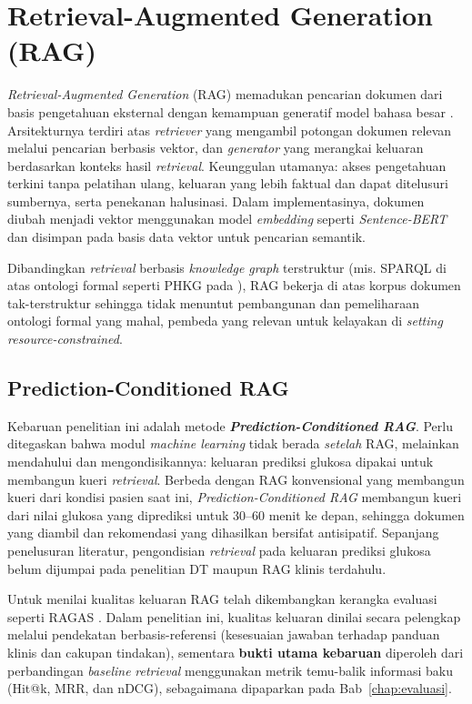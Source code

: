\section{Retrieval-Augmented Generation (RAG)}
\emph{Retrieval-Augmented Generation} (RAG) memadukan pencarian dokumen dari basis pengetahuan eksternal dengan kemampuan generatif model bahasa besar \autocite{lewis2020}. Arsitekturnya terdiri atas \emph{retriever} yang mengambil potongan dokumen relevan melalui pencarian berbasis vektor, dan \emph{generator} yang merangkai keluaran berdasarkan konteks hasil \emph{retrieval}. Keunggulan utamanya: akses pengetahuan terkini tanpa pelatihan ulang, keluaran yang lebih faktual dan dapat ditelusuri sumbernya, serta penekanan halusinasi. Dalam implementasinya, dokumen diubah menjadi vektor menggunakan model \emph{embedding} seperti \emph{Sentence-BERT} \autocite{reimers2019} dan disimpan pada basis data vektor untuk pencarian semantik.

Dibandingkan \emph{retrieval} berbasis \emph{knowledge graph} terstruktur (mis. SPARQL di atas ontologi formal seperti PHKG pada \textcite{rad2024}), RAG bekerja di atas korpus dokumen tak-terstruktur sehingga tidak menuntut pembangunan dan pemeliharaan ontologi formal yang mahal, pembeda yang relevan untuk kelayakan di \emph{setting resource-constrained}.

\subsection{Prediction-Conditioned RAG}
\label{sec:pcrag}
Kebaruan penelitian ini adalah metode \textbf{\emph{Prediction-Conditioned RAG}}. Perlu ditegaskan bahwa modul \emph{machine learning} tidak berada \emph{setelah} RAG, melainkan mendahului dan mengondisikannya: keluaran prediksi glukosa dipakai untuk membangun kueri \emph{retrieval}. Berbeda dengan RAG konvensional yang membangun kueri dari kondisi pasien saat ini, \emph{Prediction-Conditioned RAG} membangun kueri dari nilai glukosa yang diprediksi untuk 30--60 menit ke depan, sehingga dokumen yang diambil dan rekomendasi yang dihasilkan bersifat antisipatif. Sepanjang penelusuran literatur, pengondisian \emph{retrieval} pada keluaran prediksi glukosa belum dijumpai pada penelitian DT maupun RAG klinis terdahulu.

Untuk menilai kualitas keluaran RAG telah dikembangkan kerangka evaluasi seperti RAGAS \autocite{es2023}. Dalam penelitian ini, kualitas keluaran dinilai secara pelengkap melalui pendekatan berbasis-referensi (kesesuaian jawaban terhadap panduan klinis dan cakupan tindakan), sementara \textbf{bukti utama kebaruan} diperoleh dari perbandingan \emph{baseline} \emph{retrieval} menggunakan metrik temu-balik informasi baku (Hit@k, MRR, dan nDCG), sebagaimana dipaparkan pada Bab~\ref{chap:evaluasi}.

